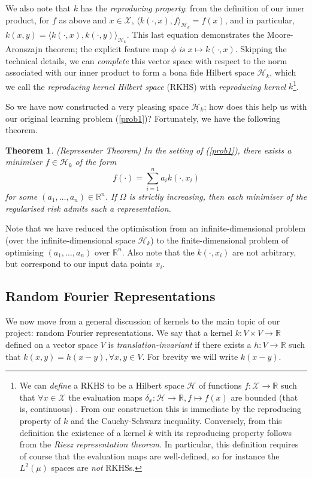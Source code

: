 \documentclass{article} %
\newtheorem{theorem}{Theorem}
\begin{document}
We also note that $k$ has the \textit{reproducing property}: from the definition of our inner product, for $f$ as above and $x \in \mathcal{X}$, $\langle k(\cdot,x),f\rangle_{\mathcal{H}_k}=f(x)$, and in particular, $k(x,y)=\langle k(\cdot,x),k(\cdot,y)\rangle_{\mathcal{H}_k}$. This last equation demonstrates the Moore-Aronszajn theorem; the explicit feature map $\phi$ \textit{is} $x\mapsto k(\cdot,x)$. Skipping the technical details, we can \textit{complete} this vector space with respect to the norm associated with our inner product to form a bona fide Hilbert space $\mathcal{H}_k$, which we call the \textit{reproducing kernel Hilbert space} (RKHS) with \textit{reproducing kernel} $k$\footnote{We can \textit{define} a RKHS to be a Hilbert space $\mathcal{H}$ of functions $f:\mathcal{X}\rightarrow\mathbb{R}$ such that $\forall x\in \mathcal{X}$ the evaluation maps $\delta_x:\mathcal{H}\rightarrow\mathbb{R},f\mapsto f(x)$ are bounded (that is, continuous) \cite{Gretton15}. From our construction this is immediate by the reproducing property of $k$ and the Cauchy-Schwarz inequality. Conversely, from this definition the existence of a kernel $k$ with its reproducing property follows from the \textit{Riesz representation theorem}. In particular, this definition requires of course that the evaluation maps are well-defined, so for instance the $L^2(\mu)$ spaces are \textit{not} RKHSs.}.
    
So we have now constructed a very pleasing space $\mathcal{H}_k$; how does this help us with our original learning problem (\ref{prob1})? Fortunately, we have the following theorem.

\begin{theorem} (Representer Theorem) 
In the setting of (\ref{prob1}), there exists a minimiser $f\in \mathcal{H}_k$ of the form $$f(\cdot)=\sum_{i=1}^n a_i k(\cdot,x_i)$$ for some $(a_1, \dots,a_n)\in \mathbb{R}^n$. If $\Omega$ is \textit{strictly} increasing, then each minimiser of the regularised risk admits such a representation.
\end{theorem}

Note that we have reduced the optimisation from an infinite-dimensional problem (over the infinite-dimensional space $\mathcal{H}_k$) to the finite-dimensional problem of optimising $(a_1,\dots,a_n)$ over $\mathbb{R}^n$. Also note that the $k(\cdot,x_i)$ are not arbitrary, but correspond to our input data points $x_i$.

\subsection{Random Fourier Representations}
We now move from a general discussion of kernels to the main topic of our project: random Fourier representations. We say that a kernel $k: V \times V \rightarrow \mathbb{R}$ defined on a vector space $V$ is \textit{translation-invariant} if there exists a $h: V\rightarrow\mathbb{R}$ such that $k(x,y)=h(x-y), \forall x,y \in V$. For brevity we will write $k(x-y)$.
\end{document}

